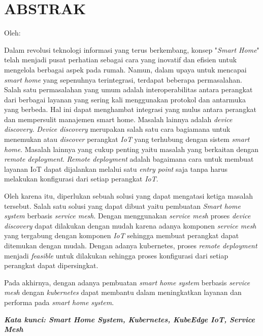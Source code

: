 \clearpage
\chapter*{ABSTRAK}
\begin{center}
  \center
  \begin{singlespace}
    \large\bfseries\MakeUppercase{\thetitle}
    
    \normalfont\normalsize
    Oleh:
    
    \bfseries \theauthor
  \end{singlespace}
\end{center}

\begin{singlespace}
  \small
  Dalam revolusi teknologi informasi yang terus berkembang, konsep "\textit{Smart Home}" telah menjadi pusat perhatian sebagai cara yang inovatif dan efisien untuk mengelola berbagai aspek pada rumah. Namun, dalam upaya untuk mencapai \textit{smart home} yang sepenuhnya terintegrasi, terdapat beberapa permasalahan. Salah satu permasalahan yang umum adalah interoperabilitas antara perangkat dari berbagai layanan yang sering kali menggunakan protokol dan antarmuka yang berbeda. Hal ini dapat menghambat integrasi yang mulus antara perangkat dan mempersulit manajemen smart home. Masalah lainnya adalah \textit{device discovery}. \textit{Device discovery} merupakan salah satu cara bagiamana untuk menemukan atau \textit{discover} perangkat \textit{IoT} yang terhubung dengan sistem \textit{smart home}. Masalah lainnya yang cukup penting yaitu masalah yang berkaitan dengan \textit{remote deployment}. \textit{Remote deployment} adalah bagaimana cara untuk membuat layanan IoT dapat dijalankan melalui satu \textit{entry point} saja tanpa harus melakukan konfigurasi dari setiap perangkat \textit{IoT}. 
  
  Oleh karena itu, diperlukan sebuah solusi yang dapat mengatasi ketiga masalah tersebut. Salah satu solusi yang dapat dibuat yaitu pembuatan \textit{Smart home system} berbasis \textit{service mesh}. Dengan menggunakan \textit{service mesh} proses \textit{device discovery} dapat dilakukan dengan mudah karena adanya komponen \textit{service mesh} yang tergabung dengan komponen \textit{IoT} sehingga membuat perangkat dapat ditemukan dengan mudah. Dengan adanya kubernetes, proses \textit{remote deployment} menjadi \textit{feasible} untuk dilakukan sehingga proses konfigurasi dari setiap perangkat dapat dipersingkat.
  
  Pada akhirnya, dengan adanya pembuatan \textit{smart home system} berbasis \textit{service mesh} dengan \textit{kubernetes} dapat membantu dalam meningkatkan layanan dan performa pada \textit{smart home system}.

  \textbf{\textit{Kata kunci: Smart Home System, Kubernetes, KubeEdge IoT, Service Mesh}}
  
\end{singlespace}
\clearpage